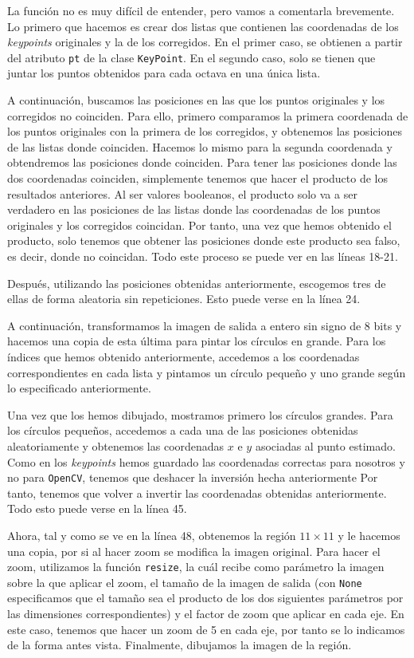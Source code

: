 \documentclass[11pt,a4paper]{article}
\begin{document}
La función no es muy difícil de entender, pero vamos a comentarla brevemente. Lo primero
que hacemos es crear dos listas que contienen las coordenadas de los \textit{keypoints}
originales y la de los corregidos. En el primer caso, se obtienen a partir del atributo \texttt{pt}
de la clase \texttt{KeyPoint}. En el segundo caso, solo se tienen que juntar los puntos obtenidos para
cada octava en una única lista.

A continuación, buscamos las posiciones en las que los puntos originales y los corregidos no coinciden.
Para ello, primero comparamos la primera coordenada de los puntos originales con la primera de los
corregidos, y obtenemos las posiciones de las listas donde coinciden. Hacemos lo mismo para
la segunda coordenada y obtendremos las posiciones donde coinciden. Para tener las posiciones donde
las dos coordenadas coinciden, simplemente tenemos que hacer el producto de los resultados anteriores. Al ser
valores booleanos, el producto solo va a ser verdadero en las posiciones de las listas
donde las coordenadas de los puntos originales y los corregidos coincidan. Por tanto, una vez que hemos
obtenido el producto, solo tenemos que obtener las posiciones donde este producto sea falso, es decir, donde
no coincidan. Todo este proceso se puede ver en las líneas 18-21.

Después, utilizando las posiciones obtenidas anteriormente, escogemos tres de ellas de forma
aleatoria sin repeticiones. Esto puede verse en la línea 24.

A continuación, transformamos la imagen de salida a entero sin signo de 8 bits y hacemos una
copia de esta última para pintar los círculos en grande. Para los índices que hemos obtenido anteriormente,
accedemos a los coordenadas correspondientes en cada lista y pintamos un círculo pequeño y uno grande
según lo especificado anteriormente.

Una vez que los hemos dibujado, mostramos primero los círculos grandes. Para los círculos
pequeños, accedemos a cada una de las posiciones obtenidas aleatoriamente y obtenemos las
coordenadas $x$ e $y$ asociadas al punto estimado. Como en los \textit{keypoints} hemos guardado
las coordenadas correctas para nosotros y no para \texttt{OpenCV}, tenemos que deshacer la inversión
hecha anteriormente Por tanto, tenemos que volver a invertir las coordenadas obtenidas anteriormente.
Todo esto puede verse en la línea 45.

Ahora, tal y como se ve en la línea 48, obtenemos la región $11 \times 11$ y le hacemos una copia,
por si al hacer zoom se modifica la imagen original. Para hacer el zoom, utilizamos la función \texttt{resize},
la cuál recibe como parámetro la imagen sobre la que aplicar el zoom, el tamaño de la imagen de salida
(con \texttt{None} especificamos que el tamaño sea el producto de los dos siguientes parámetros por las
dimensiones correspondientes) y el factor de zoom que aplicar en cada eje. En este caso, tenemos que hacer
un zoom de 5 en cada eje, por tanto se lo indicamos de la forma antes vista. Finalmente, dibujamos la
imagen de la región.
\end{document}
